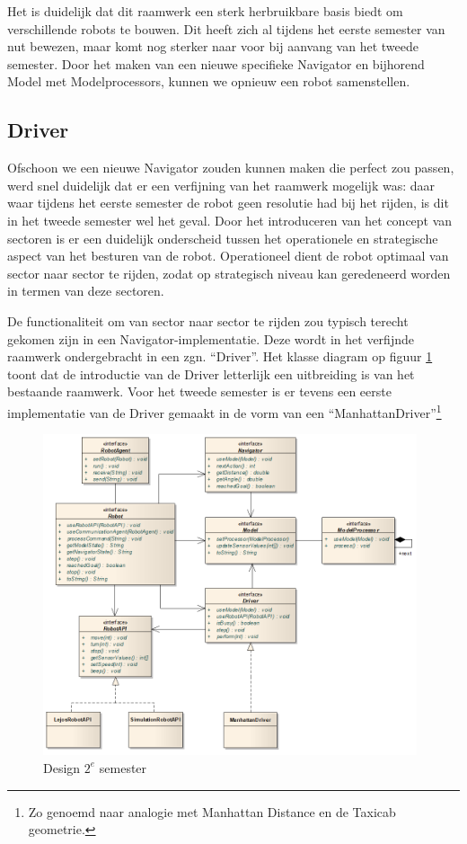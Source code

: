 \documentclass[12pt,a4paper]{report}
\begin{document}
Het is duidelijk dat dit raamwerk een sterk herbruikbare basis biedt om verschillende robots te bouwen. Dit heeft zich al tijdens het eerste semester van nut bewezen, maar komt nog sterker naar voor bij aanvang van het tweede semester. Door het maken van een nieuwe specifieke Navigator en bijhorend Model met Modelprocessors, kunnen we opnieuw een robot samenstellen.

\subsection{Driver}

Ofschoon we een nieuwe Navigator zouden kunnen maken die perfect zou passen, werd snel duidelijk dat er een verfijning van het raamwerk mogelijk was: daar waar tijdens het eerste semester de robot geen resolutie had bij het rijden, is dit in het tweede semester wel het geval. Door het introduceren van het concept van sectoren is er een duidelijk onderscheid tussen het operationele en strategische aspect van het besturen van de robot. Operationeel dient de robot optimaal van sector naar sector te rijden, zodat op strategisch niveau kan geredeneerd worden in termen van deze sectoren.

De functionaliteit om van sector naar sector te rijden zou typisch terecht gekomen zijn in een Navigator-implementatie. Deze wordt in het verfijnde raamwerk ondergebracht in een zgn. ``Driver''. Het klasse diagram op figuur \ref{uml:design-semster2} toont dat de introductie van de Driver letterlijk een uitbreiding is van het bestaande raamwerk. Voor het tweede semester is er tevens een eerste implementatie van de Driver gemaakt in de vorm van een ``ManhattanDriver''\footnote{Zo genoemd naar analogie met Manhattan Distance en de Taxicab geometrie.} 

\begin{figure}[htbp]
  \centering
  \includegraphics[width=110mm]{resources/design-semester2.png}
  \caption{Design $2^e$ semester}
  \label{uml:design-semster2}
\end{figure}
\end{document}
